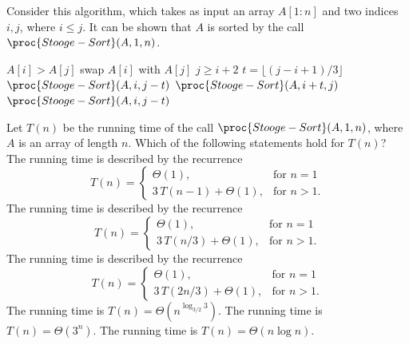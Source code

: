 Consider this algorithm, which takes as input an array $A[1:n]$ and two indices $i,j$, where $i\leq j$.
It can be shown that $A$ is sorted by the call $\proc{Stooge-Sort}(A, 1, n)$.
\begin{codebox}
\li \If $A[i] > A[j]$ \Then
\li     swap $A[i]$ with $A[j]$
    \End
\li \If $j \geq i + 2$ \Then
\li     $t = \lfloor (j - i + 1) / 3 \rfloor$
\li     $\proc{Stooge-Sort}(A, i, j - t)$
\li     $\proc{Stooge-Sort}(A, i + t, j)$
\li     $\proc{Stooge-Sort}(A, i, j - t)$
    \End
\end{codebox}
Let $T(n)$ be the running time of the call $\proc{Stooge-Sort}(A, 1, n)$, where $A$ is an array of length $n$.
Which of the following statements hold for $T(n)$?
\multipleanswers
\optionsstart
\answer The running time is described by the recurrence
\[
T(n) =
\begin{cases}
\Theta(1), & \text{for } n = 1 \\
3\,T(n-1) + \Theta(1), & \text{for } n > 1.
\end{cases}
\]
\answer The running time is described by the recurrence
\[
T(n) =
\begin{cases}
\Theta(1), & \text{for } n = 1 \\
3\,T(n/3) + \Theta(1), & \text{for } n > 1.
\end{cases}
\]
\answer The running time is described by the recurrence \correct
\[
T(n) =
\begin{cases}
\Theta(1), & \text{for } n = 1 \\
3\,T(2n/3) + \Theta(1), & \text{for } n > 1.
\end{cases}
\]
\answer The running time is $T(n)=\Theta(n^{\log_{3/2}3})$.\correct
{}
\answer The running time is $T(n)=\Theta(3^n)$.
\answer The running time is $T(n)=\Theta(n \log n)$.
\optionsend
{}

